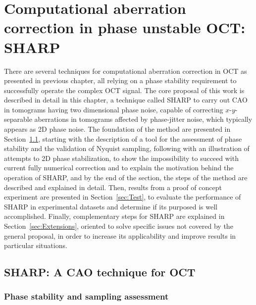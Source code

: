 \newpage
{}
\chapter[Computational aberration correction in phase-unstable OCT: SHARP]{Computational aberration correction in phase unstable OCT: SHARP}\label{chap:SHARP}

There are several techniques for computational aberration correction in OCT as presented in previous chapter, all relying on a phase stability requirement to successfully operate the complex OCT signal. The core proposal of this work is described in detail in this chapter, a technique called SHARP to carry out CAO in tomograms having two dimensional phase noise, capable of correcting $x$-$y$-separable aberrations in tomograms affected by phase-jitter noise, which typically appears as 2D phase noise. The foundation of the method are presented in Section~\ref{sec:SHARP}, starting with the description of a tool for the assessment of phase stability and the validation of Nyquist sampling, following with an illustration of attempts to 2D phase stabilization, to show the impossibility to succeed with current fully numerical correction and to explain the motivation behind the operation of SHARP, and by the end of the section, the steps of the method are described and explained in detail. Then, results from a proof of concept experiment are presented in Section~\ref{sec:Test}, to evaluate the performance of SHARP in experimental datasets and determine if its purposed is well accomplished. Finally, complementary steps for SHARP are explained in Section~\ref{sec:Extensions}, oriented to solve specific issues not covered by the general proposal, in order to increase its applicability and improve results in particular situations.

\section{SHARP: A CAO technique for OCT}\label{sec:SHARP}

\subsection{Phase stability and sampling assessment}

